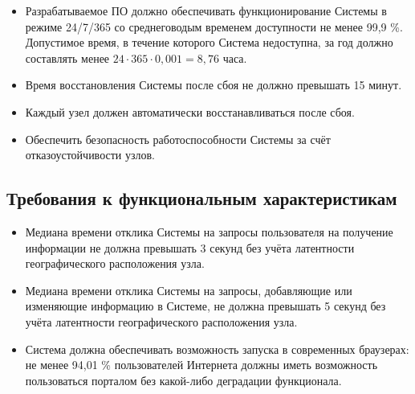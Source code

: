 \documentclass{bmstu-gost-7-32}
\begin{document}
\begin{itemize}
	\item Разрабатываемое ПО должно обеспечивать функционирование Системы в режиме 24/7/365 со среднеговодым временем доступности не менее 99,9 \%.
	Допустимое время, в течение которого Система недоступна, за год должно составлять менее $24 \cdot 365 \cdot 0,001 = 8,76$ часа.
	\item Время восстановления Системы после сбоя не должно превышать 15 минут.
	\item Каждый узел должен автоматически восстанавливаться после сбоя.
	\item Обеспечить безопасность работоспособности Системы за счёт отказоустойчивости узлов.
\end{itemize}

\subsection{Требования к функциональным характеристикам}




\begin{itemize}
	\item Медиана времени отклика Системы на запросы пользователя на получение информации не должна превышать 3 секунд без учёта латентности географического расположения узла.
	\item Медиана времени отклика Системы на запросы, добавляющие или изменяющие информацию в Системе, не должна превышать 5 секунд без учёта латентности географического расположения узла.
	\item Система должна обеспечивать возможность запуска в современных браузерах: не менее 94,01 \% пользователей Интернета должны иметь возможность пользоваться порталом без какой-либо деградации функционала.
\end{itemize}
\end{document}
